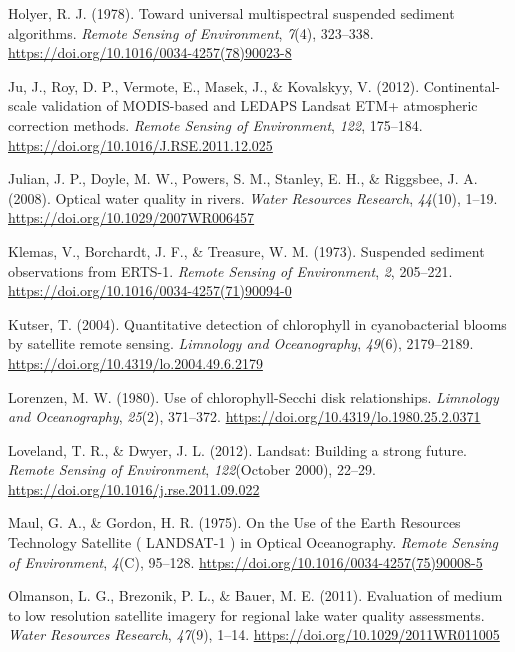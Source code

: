 \documentclass[]{article}
\begin{document}
\leavevmode\hypertarget{ref-Holyer1978}{}%
Holyer, R. J. (1978). Toward universal multispectral suspended sediment
algorithms. \emph{Remote Sensing of Environment}, \emph{7}(4), 323--338.
\url{https://doi.org/10.1016/0034-4257(78)90023-8}

\leavevmode\hypertarget{ref-Ju2012}{}%
Ju, J., Roy, D. P., Vermote, E., Masek, J., \& Kovalskyy, V. (2012).
Continental-scale validation of MODIS-based and LEDAPS Landsat ETM+
atmospheric correction methods. \emph{Remote Sensing of Environment},
\emph{122}, 175--184. \url{https://doi.org/10.1016/J.RSE.2011.12.025}

\leavevmode\hypertarget{ref-Julian2008}{}%
Julian, J. P., Doyle, M. W., Powers, S. M., Stanley, E. H., \& Riggsbee,
J. A. (2008). Optical water quality in rivers. \emph{Water Resources
Research}, \emph{44}(10), 1--19.
\url{https://doi.org/10.1029/2007WR006457}

\leavevmode\hypertarget{ref-Klemas1973}{}%
Klemas, V., Borchardt, J. F., \& Treasure, W. M. (1973). Suspended
sediment observations from ERTS-1. \emph{Remote Sensing of Environment},
\emph{2}, 205--221. \url{https://doi.org/10.1016/0034-4257(71)90094-0}

\leavevmode\hypertarget{ref-Kutser2004}{}%
Kutser, T. (2004). Quantitative detection of chlorophyll in
cyanobacterial blooms by satellite remote sensing. \emph{Limnology and
Oceanography}, \emph{49}(6), 2179--2189.
\url{https://doi.org/10.4319/lo.2004.49.6.2179}

\leavevmode\hypertarget{ref-Lorenzen1980}{}%
Lorenzen, M. W. (1980). Use of chlorophyll-Secchi disk relationships.
\emph{Limnology and Oceanography}, \emph{25}(2), 371--372.
\url{https://doi.org/10.4319/lo.1980.25.2.0371}

\leavevmode\hypertarget{ref-Loveland2012}{}%
Loveland, T. R., \& Dwyer, J. L. (2012). Landsat: Building a strong
future. \emph{Remote Sensing of Environment}, \emph{122}(October 2000),
22--29. \url{https://doi.org/10.1016/j.rse.2011.09.022}

\leavevmode\hypertarget{ref-Maul1975}{}%
Maul, G. A., \& Gordon, H. R. (1975). On the Use of the Earth Resources
Technology Satellite ( LANDSAT-1 ) in Optical Oceanography. \emph{Remote
Sensing of Environment}, \emph{4}(C), 95--128.
\url{https://doi.org/10.1016/0034-4257(75)90008-5}

\leavevmode\hypertarget{ref-Olmanson2011}{}%
Olmanson, L. G., Brezonik, P. L., \& Bauer, M. E. (2011). Evaluation of
medium to low resolution satellite imagery for regional lake water
quality assessments. \emph{Water Resources Research}, \emph{47}(9),
1--14. \url{https://doi.org/10.1029/2011WR011005}
\end{document}
